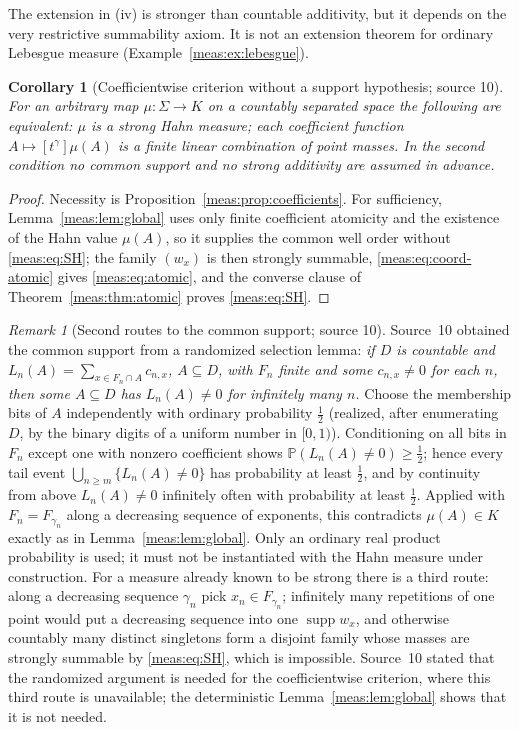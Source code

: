 \documentclass[11pt]{article}
\numberwithin{equation}{section}
\newtheorem{corollary}[theorem]{Corollary}
\theoremstyle{definition}
\theoremstyle{remark}
\newtheorem{remark}[theorem]{Remark}
\newcommand{\supp}{\operatorname{supp}}
\newcommand{\coef}[2]{[t^{#1}]#2}
\begin{document}
The extension in (iv) is stronger than countable additivity, but it depends on
the very restrictive summability axiom. It is not an extension theorem for
ordinary Lebesgue measure (Example~\ref{meas:ex:lebesgue}).

\begin{corollary}[Coefficientwise criterion without a support hypothesis;
source 10]\label{meas:cor:coefficient-test}
For an arbitrary map $\mu:\Sigma\to K$ on a countably separated space the
following are equivalent: $\mu$ is a strong Hahn measure; each coefficient
function $A\mapsto\coef{\gamma}{\mu(A)}$ is a finite linear combination of point
masses. In the second condition no common support and no strong additivity
are assumed in advance.
\end{corollary}
\begin{proof}
Necessity is Proposition~\ref{meas:prop:coefficients}. For sufficiency,
Lemma~\ref{meas:lem:global} uses only finite coefficient atomicity and the
existence of the Hahn value $\mu(A)$, so it supplies the common well order
without \eqref{meas:eq:SH}; the family $(w_x)$ is then strongly summable,
\eqref{meas:eq:coord-atomic} gives \eqref{meas:eq:atomic}, and the converse
clause of Theorem~\ref{meas:thm:atomic} proves \eqref{meas:eq:SH}.
\end{proof}

\begin{remark}[Second routes to the common support; source 10]
\label{meas:rem:selection}
Source~10 obtained the common support from a randomized selection lemma:
\emph{if $D$ is countable and $L_n(A)=\sum_{x\in F_n\cap A}c_{n,x}$, $A\subseteq D$,
with $F_n$ finite and some $c_{n,x}\ne0$ for each $n$, then some $A\subseteq D$
has $L_n(A)\ne0$ for infinitely many $n$.} Choose the membership bits of $A$
independently with ordinary probability $\tfrac12$ (realized, after enumerating
$D$, by the binary digits of a uniform number in $[0,1)$). Conditioning on all
bits in $F_n$ except one with nonzero coefficient shows
$\mathbb P(L_n(A)\ne0)\ge\frac12$; hence every tail event
$\bigcup_{n\ge m}\{L_n(A)\ne0\}$ has probability at least $\frac12$, and by
continuity from above $L_n(A)\ne0$ infinitely often with probability at least
$\frac12$. Applied with $F_n=F_{\gamma_n}$ along a decreasing sequence of
exponents, this contradicts $\mu(A)\in K$ exactly as in
Lemma~\ref{meas:lem:global}. Only an ordinary real product probability is used;
it must not be instantiated with the Hahn measure under construction. For a
measure already known to be strong there is a third route: along a decreasing
sequence $\gamma_n$ pick $x_n\in F_{\gamma_n}$; infinitely many repetitions of one
point would put a decreasing sequence into one $\supp w_x$, and otherwise
countably many distinct singletons form a disjoint family whose masses are
strongly summable by \eqref{meas:eq:SH}, which is impossible. Source~10 stated
that the randomized argument is needed for the coefficientwise criterion,
where this third route is unavailable; the deterministic
Lemma~\ref{meas:lem:global} shows that it is not needed.
\end{remark}
\end{document}
